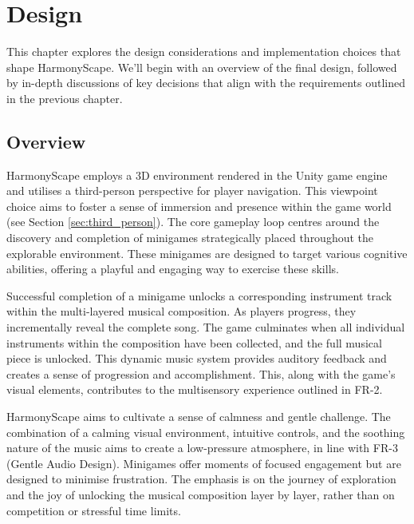 \documentclass{l4proj}
\begin{document}



\chapter{Design}
This chapter explores the design considerations and implementation choices that shape HarmonyScape. We'll begin with an overview of the final design, followed by in-depth discussions of key decisions that align with the requirements outlined in the previous chapter.


\section{Overview}
HarmonyScape employs a 3D environment rendered in the Unity game engine and utilises a third-person perspective for player navigation. This viewpoint choice aims to foster a sense of immersion and presence within the game world (see Section \ref{sec:third_person}). The core gameplay loop centres around the discovery and completion of minigames strategically placed throughout the explorable environment. These minigames are designed to target various cognitive abilities, offering a playful and engaging way to exercise these skills.

Successful completion of a minigame unlocks a corresponding instrument track within the multi-layered musical composition. As players progress, they incrementally reveal the complete song. The game culminates when all individual instruments within the composition have been collected, and the full musical piece is unlocked. This dynamic music system provides auditory feedback and creates a sense of progression and accomplishment. This, along with the game's visual elements, contributes to the multisensory experience outlined in FR-2.

HarmonyScape aims to cultivate a sense of calmness and gentle challenge. The combination of a calming visual environment, intuitive controls, and the soothing nature of the music aims to create a low-pressure atmosphere, in line with FR-3 (Gentle Audio Design). Minigames offer moments of focused engagement but are designed to minimise frustration. The emphasis is on the journey of exploration and the joy of unlocking the musical composition layer by layer, rather than on competition or stressful time limits.
\end{document}
